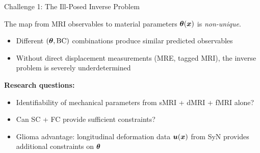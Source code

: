 \begin{frame}{Challenge 1: The Ill-Posed Inverse Problem}

  The map from MRI observables to material parameters $\bm{\theta}(\bm{x})$
  is \emph{non-unique}.

  \bigskip

  \begin{itemize}
    \item Different $(\bm{\theta}, \text{BC})$ combinations produce similar
      predicted observables
    \item Without direct displacement measurements (MRE, tagged MRI),
      the inverse problem is severely underdetermined
  \end{itemize}

  \bigskip

  \textbf{Research questions:}
  \begin{itemize}
    \item Identifiability of mechanical parameters from
      sMRI + dMRI + fMRI alone?
    \item Can SC + FC provide sufficient constraints?
    \item \alert{Glioma advantage:} longitudinal deformation data
      $\bm{u}(\bm{x})$ from SyN provides additional constraints on
      $\bm{\theta}$
  \end{itemize}

\end{frame}

